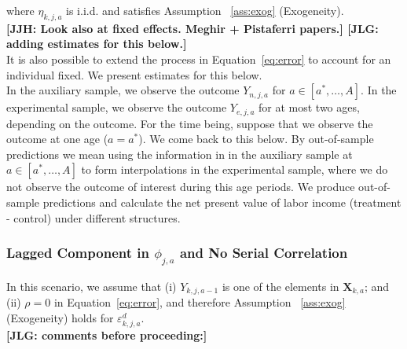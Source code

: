 \noindent where $\eta_{k,j,{a}}$ is i.i.d. and satisfies Assumption ~\ref{ass:exog} (Exogeneity).\\

\noindent \textbf{[JJH: Look also at fixed effects. Meghir + Pistaferri papers.] [JLG: adding estimates for this below.]}\\

\noindent It is also possible to extend the process in Equation~\ref{eq:error} to account for an individual fixed. We present estimates for this below.\\


\noindent In the auxiliary sample, we observe the outcome $Y_{n,j,a}$ for $a \in [a^*, \ldots, A]$. In the experimental sample, we observe the outcome $Y_{e,j,a}$ for at most two ages, depending on the outcome. For the time being, suppose that we observe the outcome at one age ($a = a^*$). We come back to this below. By out-of-sample predictions we mean using the information in in the auxiliary sample at  $a \in [a^*, \ldots, A]$ to form interpolations in the experimental sample, where we do not observe the outcome of interest during this age periods. We produce out-of-sample predictions and calculate the net present value of labor income (treatment - control) under different structures.\\ 

\subsubsection{Lagged Component in $\phi_{j,a}$ and No Serial Correlation}

\noindent In this scenario, we assume that (i)  $Y_{k,j,a-1}$ is one of the elements in $\bm{X}_{k,a}$; and (ii) $\rho = 0$ in Equation~\eqref{eq:error}, and therefore Assumption ~\ref{ass:exog} (Exogeneity) holds for $\varepsilon_{k,j,a}^d$.\\

\noindent \textbf{[JLG: comments before proceeding:]}

